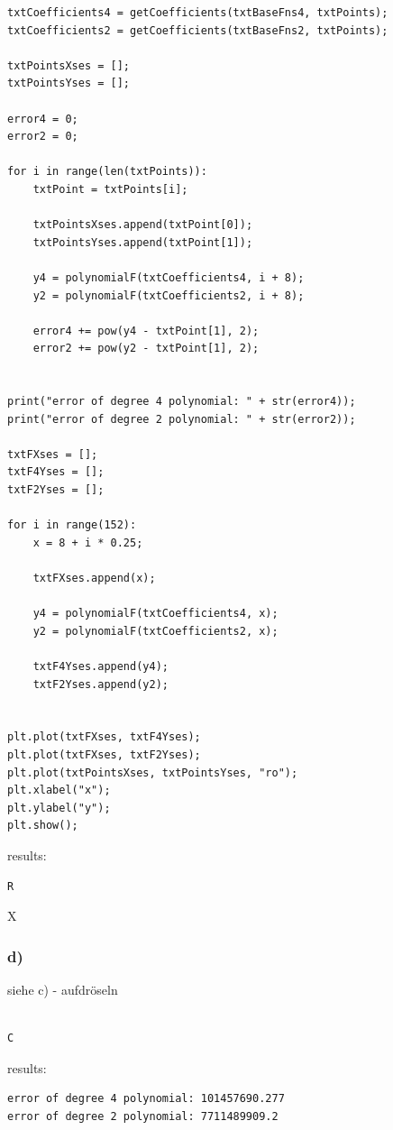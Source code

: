 \begin{lstlisting}[caption=todo]
txtCoefficients4 = getCoefficients(txtBaseFns4, txtPoints);
txtCoefficients2 = getCoefficients(txtBaseFns2, txtPoints);

txtPointsXses = [];
txtPointsYses = [];

error4 = 0;
error2 = 0;

for i in range(len(txtPoints)):
	txtPoint = txtPoints[i];
	
	txtPointsXses.append(txtPoint[0]);
	txtPointsYses.append(txtPoint[1]);
	
	y4 = polynomialF(txtCoefficients4, i + 8);
	y2 = polynomialF(txtCoefficients2, i + 8);
	
	error4 += pow(y4 - txtPoint[1], 2);
	error2 += pow(y2 - txtPoint[1], 2);


print("error of degree 4 polynomial: " + str(error4));
print("error of degree 2 polynomial: " + str(error2));

txtFXses = [];
txtF4Yses = [];
txtF2Yses = [];

for i in range(152):
	x = 8 + i * 0.25;
	
	txtFXses.append(x);
	
	y4 = polynomialF(txtCoefficients4, x);
	y2 = polynomialF(txtCoefficients2, x);
	
	txtF4Yses.append(y4);
	txtF2Yses.append(y2);


plt.plot(txtFXses, txtF4Yses);
plt.plot(txtFXses, txtF2Yses);
plt.plot(txtPointsXses, txtPointsYses, "ro");
plt.xlabel("x");
plt.ylabel("y");
plt.show();

\end{lstlisting}


results:

\begin{lstlisting}[caption=Result of 1.1 a), keywordstyle=\color{black}]
R
\end{lstlisting}

X



\subsubsection{d)}

siehe c) - aufdröseln

\begin{lstlisting}[caption=todo]

C

\end{lstlisting}


results:

\begin{lstlisting}[caption=Result of 1.1 a), keywordstyle=\color{black}]
error of degree 4 polynomial: 101457690.277
error of degree 2 polynomial: 7711489909.2
\end{lstlisting}

